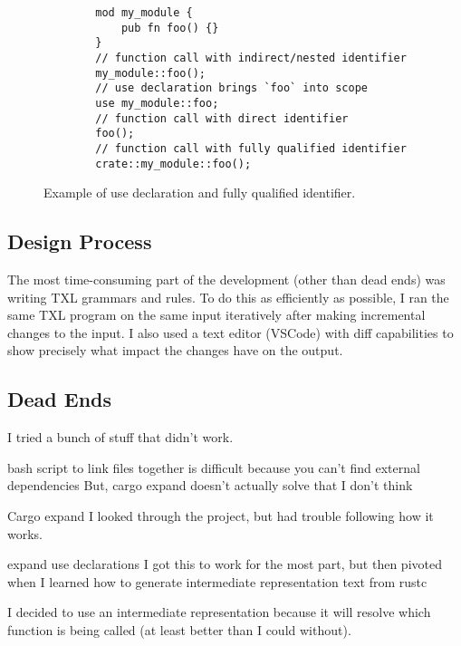 \documentclass[11pt]{article}
\begin{document}


\begin{figure}
    \caption{Example of use declaration and fully qualified identifier.}
    \label{fig:qualifiers}
    \begin{lstlisting}
        mod my_module {
            pub fn foo() {}
        }
        // function call with indirect/nested identifier
        my_module::foo();
        // use declaration brings `foo` into scope
        use my_module::foo;
        // function call with direct identifier
        foo();
        // function call with fully qualified identifier
        crate::my_module::foo();
    \end{lstlisting}
\end{figure}

\subsection{Design Process}
The most time-consuming part of the development (other than dead ends) was writing TXL grammars and rules.
To do this as efficiently as possible, I ran the same TXL program on the same input iteratively after making incremental changes to the input.
I also used a text editor (VSCode) with diff capabilities to show precisely what impact the changes have on the output.

\subsection{Dead Ends}
I tried a bunch of stuff that didn't work.

bash script to link files together is difficult because you can't find external dependencies
But, cargo expand doesn't actually solve that I don't think

Cargo expand
I looked through the project, but had trouble following how it works.

expand use declarations
I got this to work for the most part, but then pivoted when I learned how to generate intermediate representation text from rustc

I decided to use an intermediate representation because it will resolve which function is being called (at least better than I could without).
\end{document}
